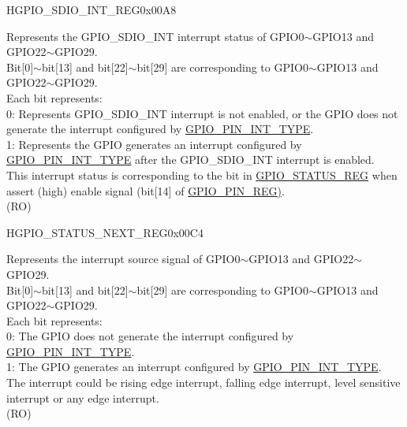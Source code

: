 \begin{register}{H}{GPIO\_SDIO\_INT\_REG}{0x00A8}\label{regdesc:GPIOSDIOINTREG}
%
\regnewline%
\begin{regdesc}\begin{reglist}
\label{fielddesc:GPIOSDIOINT}\item [GPIO\_SDIO\_INT] Represents the GPIO\_SDIO\_INT interrupt status of GPIO0$\sim$GPIO13 and GPIO22$\sim$GPIO29. \\
Bit[0]$\sim$bit[13] and bit[22]$\sim$bit[29] are corresponding to GPIO0$\sim$GPIO13 and GPIO22$\sim$GPIO29.\\
Each bit represents:\\
0: Represents GPIO\_SDIO\_INT interrupt is not enabled, or the GPIO does not generate the interrupt configured by \hyperref[fielddesc:GPIOPINNINTTYPE]{GPIO\_PIN\_INT\_TYPE}.\\
1: Represents the GPIO generates an interrupt configured by \hyperref[fielddesc:GPIOPINNINTTYPE]{GPIO\_PIN\_INT\_TYPE} after the GPIO\_SDIO\_INT interrupt is enabled.\\
This interrupt status is corresponding to the bit in \hyperref[regdesc:GPIOSTATUSREG]{GPIO\_STATUS\_REG} when assert (high) enable signal (bit[14] of \hyperref[regdesc:GPIOPINNREG]{GPIO\_PIN\_REG)}. \\
(RO)
\end{reglist}\end{regdesc}
\end{register}


\begin{register}{H}{GPIO\_STATUS\_NEXT\_REG}{0x00C4}\label{regdesc:GPIOSTATUSNEXTREG}
%
\regnewline%
\begin{regdesc}\begin{reglist}
\label{fielddesc:GPIOSTATUSINTERRUPTNEXT}\item [GPIO\_STATUS\_INTERRUPT\_NEXT] Represents the interrupt source signal of GPIO0$\sim$GPIO13 and GPIO22$\sim$GPIO29. \\Bit[0]$\sim$bit[13] and bit[22]$\sim$bit[29] are corresponding to GPIO0$\sim$GPIO13 and GPIO22$\sim$GPIO29.\\
Each bit represents:\\
0: The GPIO does not generate the interrupt configured by \hyperref[fielddesc:GPIOPINNINTTYPE]{GPIO\_PIN\_INT\_TYPE}.\\
1: The GPIO generates an interrupt configured by \hyperref[fielddesc:GPIOPINNINTTYPE]{GPIO\_PIN\_INT\_TYPE}.\\
The interrupt could be rising edge interrupt, falling edge interrupt, level sensitive interrupt or any edge interrupt.\\ (RO)
\end{reglist}\end{regdesc}
\end{register}


